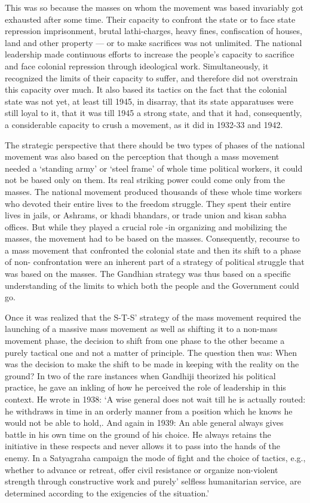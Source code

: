 This was so because the masses on whom the movement was based invariably got exhausted after some time. Their capacity to confront the state or to face state repression imprisonment, brutal lathi-charges, heavy fines, confiscation of houses, land and other property — or to make sacrifices was not unlimited. The national leadership made continuous efforts to increase the people's capacity to sacrifice and face colonial repression through ideological work. Simultaneously, it recognized the limits of their capacity to suffer, and therefore did not overstrain this capacity over much. It also based its tactics on the fact that the colonial state was not yet, at least till 1945, in disarray, that its state apparatuses were still loyal to it, that it was till 1945 a strong state, and that it had, consequently, a considerable capacity to crush a movement, as it did in 1932-33 and 1942. 

The strategic perspective that there should be two types of phases of the national movement was also based on the perception that though a mass movement needed a `standing army' or `steel frame' of whole time political workers, it could not be based only on them. Its real striking power could come only from the masses. The national movement produced thousands of these whole time workers who devoted their entire lives to the freedom struggle. They spent their entire lives in jails, or Ashrams, or khadi bhandars, or trade union and kisan sabha offices. But while they played a crucial role -in organizing and mobilizing the masses, the movement had to be based on the masses. Consequently, recourse to a mass movement that confronted the colonial state and then its shift to a phase of non- confrontation were an inherent part of a strategy of political struggle that was based on the masses. The Gandhian strategy was thus based on a specific understanding of the limits to which both the people and the Government could go. 

Once it was realized that the S-T-S' strategy of the mass movement required the launching of a massive mass movement as well as shifting it to a non-mass movement phase, the decision to shift from one phase to the other became a purely tactical one and not a matter of principle. The question then was: When was the decision to make the shift to be made in keeping with the reality on the ground? In two of the rare instances when Gandhiji theorized his political practice, he gave an inkling of how he perceived the role of leadership in this context. He wrote in 1938: `A wise general does not wait till he is actually routed: he withdraws in time in an orderly manner from a position which he knows he would not be able to hold,. And again in 1939: An able general always gives battle in his own time on the ground of his choice. He always retains the initiative in these respects and never allows it to pass into the hands of the enemy. In a Satyagraha campaign the mode of fight and the choice of tactics, e.g., whether to advance or retreat, offer civil resistance or organize non-violent strength through constructive work and purely' selfless humanitarian service, are determined according to the exigencies of the situation.' 

